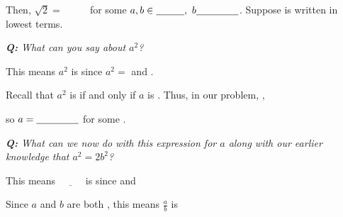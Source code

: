 \documentclass[fleqn]{article}
\newcommand{\ds}{\displaystyle}
\theoremstyle{definition}
\begin{document}
\vspace{.25cm}

Then, $\sqrt{2} = \hspace{1cm}$ for some $a, b \in \underline{\hspace{1cm}}, \ b \underline{\hspace{1.5cm}}$. Suppose \hspace{1cm} is written in lowest terms.

\vspace{.25cm}
{\it \textbf{Q:} What can you say about $a^2$?}

\vspace{2cm}
\hspace{7cm} This means $a^2$ is \underline{\hspace{2cm}} since $a^2 = $\underline{\hspace{1.5cm}} and \underline{\hspace{1.5cm}}. 

\vspace{.5cm}
Recall that $a^2$ is \underline{\hspace{2cm}} if and only if $a$ is \underline{\hspace{2cm}}. Thus, in our problem, \underline{\hspace{3.5cm}}, 

\vspace{.25cm}
so $a= \underline{\hspace{1.5cm}}$ for some \underline{\hspace{1.5cm}}. 

\vspace{.25cm}
{\it \textbf{Q:} What can we now do with this expression for $a$ along with our earlier knowledge that $a^2=2b^2$? }

\vspace{3cm}

\hspace{6.5cm} This means $\underline{\hspace{1cm}}$ is \underline{\hspace{2cm}} since \underline{\hspace{2.5cm}} and \underline{\hspace{1.5cm}}

\vspace{.25cm} 
Since $a$ and $b$ are both \underline{\hspace{2cm}}, this means $\ds{\frac{a}{b}}$ is \underline{\hspace{7cm}} 
\end{document}

